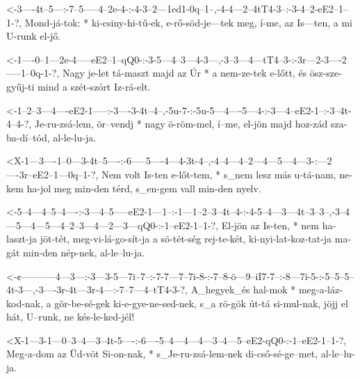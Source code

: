   {<-3----4t--5---:-7--5-----4--2e-4-:-4-3--2---1ed1-0q--1--,-4-4---2--4tT4-3--:-3-4--2-eE2--1--1-?,}
  {  Mond-já-tok: * ki-csiny-hi-tű-ek, e-rő-söd-je---tek meg, í-me, az Is---ten, a mi U-runk el-jő.}


  {<-1----0--1---2e-4-----eE2--1--qQ0-:-3-5---4--3---4-3---,-3--3---4---tT4--3-:-3r---2-3----2-----1--0q-1-?,}
  {  Nagy je-let tá-maszt majd az Úr  * a nem-ze-tek e-lőtt, és ösz-sze-gyűj-ti  mind a szét-szórt Iz-rá-elt.}



  {<-1--2--3---4----eE2-1-----:-3----3-4t--4--,-5u-7-:-5u-5---4----5---4-:-3---4--eE2-1--:-3--4t-4--4-?,}
  {  Je-ru-zsá-lem, ör--vendj * nagy ö-röm-mel, í--me, el-jön majd hoz-zád sza-ba-dí--tód, al-le-lu-ja.}

  {<X-1---3----1--0---3-4t--5----:-6-----5----4---4-3t-4--,-4--4---4--2---4---5---4---3-:---2----3r--eE2--1---0q--1-?,}
  {   Nem volt Is-ten e-lőt-tem, * s_nem lesz más u-tá-nam, ne-kem ha-jol meg min-den térd, s_en-gem vall min-den nyelv.}


  {<-5--4---4--5--4----:-3---4--5-----eE2-1---1--:-1---1--2--3--4t--4-:-4-5--4---3---4t--3--3--,-3--4---5---4---5---4--2--3---4---2---3---qQ0-:-1--eE2-1--1-?,}
  {  El-jön az Is-ten, * nem ha-laszt-ja  jöt-tét, meg-vi-lá-go-sít-ja  a sö-tét-ség rej-te-két, ki-nyi-lat-koz-tat-ja ma-gát min-den nép-nek,  al-le--lu-ja.}

  {<-¢-----------4---3---:-3---3-5---7i--7--:-7-7---7--7i-8-:-7--8-ö---9--iI7-7--:-8---7i-5-:-5--5--5--4t-3---,-3----3r-4t---3r-4---:-7--7---4--tT4-3-?,}
  {  A_hegyek_és hal-mok * meg-a-láz-kod-nak, a gör-be-sé-gek ki-e-gye-ne-sed-nek, s_a rö-gök út-tá si-mul-nak, jöjj el hát, U--runk, ne kés-le-ked-jél!}

  {<X-1---3-1---0--3--4---3--4t-5----:-6----5--4---4---4---3--4---5--eE2-qQ0-:-1--eE2-1--1-?,}
  {   Meg-a-dom az Üd-vöt Si-on-nak, * s_Je-ru-zsá-lem-nek di-cső-sé-ge--met,  al-le--lu-ja.}

